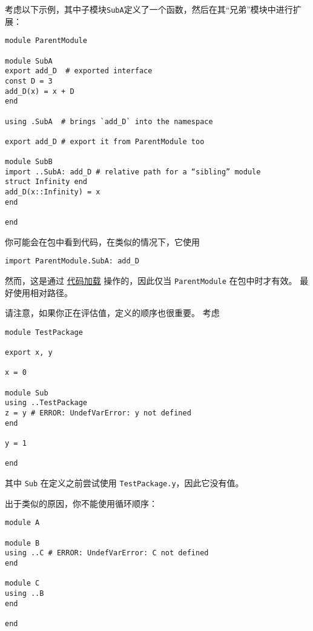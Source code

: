 考虑以下示例，其中子模块\texttt{SubA}定义了一个函数，然后在其“兄弟”模块中进行扩展：




\begin{verbatim}
module ParentModule

module SubA
export add_D  # exported interface
const D = 3
add_D(x) = x + D
end

using .SubA  # brings `add_D` into the namespace

export add_D # export it from ParentModule too

module SubB
import ..SubA: add_D # relative path for a “sibling” module
struct Infinity end
add_D(x::Infinity) = x
end

end
\end{verbatim}



你可能会在包中看到代码，在类似的情况下，它使用




\begin{verbatim}
import ParentModule.SubA: add_D
\end{verbatim}



然而，这是通过 \hyperlink{11949095373261797528}{代码加载} 操作的，因此仅当 \texttt{ParentModule} 在包中时才有效。 最好使用相对路径。



请注意，如果你正在评估值，定义的顺序也很重要。 考虑




\begin{verbatim}
module TestPackage

export x, y

x = 0

module Sub
using ..TestPackage
z = y # ERROR: UndefVarError: y not defined
end

y = 1

end
\end{verbatim}



其中 \texttt{Sub} 在定义之前尝试使用 \texttt{TestPackage.y}，因此它没有值。



出于类似的原因，你不能使用循环顺序：




\begin{verbatim}
module A

module B
using ..C # ERROR: UndefVarError: C not defined
end

module C
using ..B
end

end
\end{verbatim}



